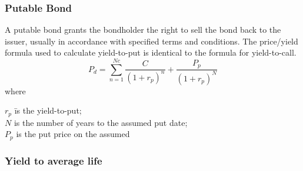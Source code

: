 \documentclass[8pt,a4paper]{article}
\begin{document}
\subsubsection{Putable Bond}
A putable bond grants the bondholder the right to sell the bond back to the issuer, usually in accordance with specified terms and conditions. The price/yield formula used to calculate yield-to-put is identical to the formula for yield-to-call.
\[
	P_d=\sum_{n=1}^{Nc} \frac{C}{(1+r_p)^n} + \frac{P_p}{(1+r_p)^N}
\]
where
\begin{tabbing}
$r_p$ \= is the yield-to-put;\\
$N$ \> is the number of years to the assumed put date;\\
$P_p$ \> is the put price on the assumed
\end{tabbing}

\subsubsection{Yield to average life}
\end{document}
